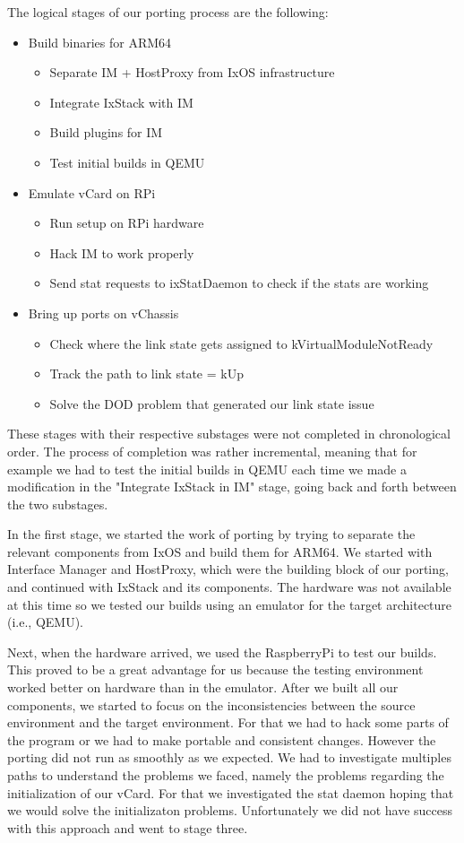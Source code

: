 The logical stages of our porting process are the following:
\begin{itemize}
    \item Build binaries for ARM64
    \begin{itemize}
        \item Separate IM + HostProxy from IxOS infrastructure
        \item Integrate IxStack with IM
        \item Build plugins for IM
        \item Test initial builds in QEMU
    \end{itemize}
    \item Emulate vCard on RPi
    \begin{itemize}
        \item Run setup on RPi hardware
        \item Hack IM to work properly
        \item Send stat requests to ixStatDaemon to check if the stats are working
    \end{itemize}
    \item Bring up ports on vChassis
    \begin{itemize}
        \item Check where the link state gets assigned to kVirtualModuleNotReady
        \item Track the path to link state = kUp
        \item Solve the DOD problem that generated our link state issue
    \end{itemize}
\end{itemize}
These stages with their respective substages were not completed in chronological
order. The process of completion was rather incremental, meaning that for
example we had to test the initial builds in QEMU each time we made a
modification in the "Integrate IxStack in IM" stage, going back and forth
between the two substages.

In the first stage, we started the work of porting by trying to separate the
relevant components from IxOS and build them for ARM64. We started with
Interface Manager and HostProxy, which were the building block of our porting,
and continued with IxStack and its components. The hardware was not available
at this time so we tested our builds using an emulator for the target
architecture (i.e., QEMU).

Next, when the hardware arrived, we used the RaspberryPi to test our builds.
This proved to be a great advantage for us because the testing environment
worked better on hardware than in the emulator. After we built all our
components, we started to focus on the inconsistencies between the source
environment and the target environment. For that we had to hack some parts of
the program or we had to make portable and consistent changes. However the
porting did not run as smoothly as we expected. We had to investigate multiples
paths to understand the problems we faced, namely the problems regarding the
initialization of our vCard. For that we investigated the stat daemon hoping
that we would solve the initializaton problems. Unfortunately we did not have
success with this approach and went to stage three.

